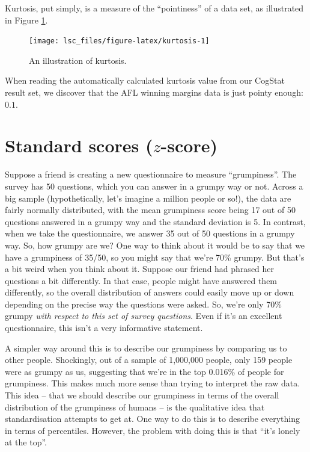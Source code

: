\documentclass[
  11pt,
  a4paper,
  twoside,symmetric,openright]{book}
\theoremstyle{break}
\theoremstyle{break}
\begin{document}
Kurtosis, put simply, is a measure of the ``pointiness'' of a data set, as illustrated in Figure \ref{fig:kurtosis}.

\begin{figure}[H]

{\centering \texttt{[image: lsc\_files/figure-latex/kurtosis-1]} 

}

\caption{An illustration of kurtosis.}\label{fig:kurtosis}
\end{figure}

When reading the automatically calculated kurtosis value from our CogStat result set, we discover that the AFL winning margins data is just pointy enough: \(0.1\).

\section{\texorpdfstring{Standard scores (\(z\)-score)}{Standard scores (z-score)}}\label{zscore}

Suppose a friend is creating a new questionnaire to measure ``grumpiness''. The survey has 50 questions, which you can answer in a grumpy way or not. Across a big sample (hypothetically, let's imagine a million people or so!), the data are fairly normally distributed, with the mean grumpiness score being 17 out of 50 questions answered in a grumpy way and the standard deviation is 5. In contrast, when we take the questionnaire, we answer 35 out of 50 questions in a grumpy way. So, how grumpy are we? One way to think about it would be to say that we have a grumpiness of 35/50, so you might say that we're 70\% grumpy. But that's a bit weird when you think about it. Suppose our friend had phrased her questions a bit differently. In that case, people might have answered them differently, so the overall distribution of answers could easily move up or down depending on the precise way the questions were asked. So, we're only 70\% grumpy \emph{with respect to this set of survey questions}. Even if it's an excellent questionnaire, this isn't a very informative statement.

A simpler way around this is to describe our grumpiness by comparing us to other people. Shockingly, out of a sample of 1,000,000 people, only 159 people were as grumpy as us, suggesting that we're in the top 0.016\% of people for grumpiness. This makes much more sense than trying to interpret the raw data. This idea -- that we should describe our grumpiness in terms of the overall distribution of the grumpiness of humans -- is the qualitative idea that standardisation attempts to get at. One way to do this is to describe everything in terms of percentiles. However, the problem with doing this is that ``it's lonely at the top''.
\end{document}
